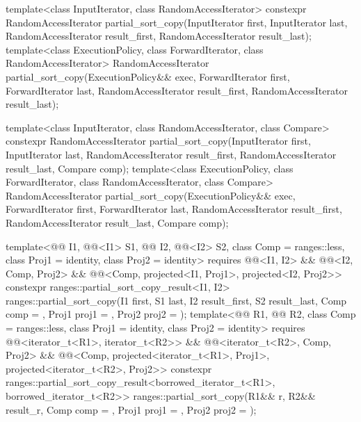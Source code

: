%
\begin{itemdecl}
template<class InputIterator, class RandomAccessIterator>
  constexpr RandomAccessIterator
    partial_sort_copy(InputIterator first, InputIterator last,
                      RandomAccessIterator result_first,
                      RandomAccessIterator result_last);
template<class ExecutionPolicy, class ForwardIterator, class RandomAccessIterator>
  RandomAccessIterator
    partial_sort_copy(ExecutionPolicy&& exec,
                      ForwardIterator first, ForwardIterator last,
                      RandomAccessIterator result_first,
                      RandomAccessIterator result_last);

template<class InputIterator, class RandomAccessIterator,
         class Compare>
  constexpr RandomAccessIterator
    partial_sort_copy(InputIterator first, InputIterator last,
                      RandomAccessIterator result_first,
                      RandomAccessIterator result_last,
                      Compare comp);
template<class ExecutionPolicy, class ForwardIterator, class RandomAccessIterator,
         class Compare>
  RandomAccessIterator
    partial_sort_copy(ExecutionPolicy&& exec,
                      ForwardIterator first, ForwardIterator last,
                      RandomAccessIterator result_first,
                      RandomAccessIterator result_last,
                      Compare comp);

template<@@ I1, @@<I1> S1, @@ I2, @@<I2> S2,
         class Comp = ranges::less, class Proj1 = identity, class Proj2 = identity>
  requires @@<I1, I2> && @@<I2, Comp, Proj2> &&
           @@<Comp, projected<I1, Proj1>, projected<I2, Proj2>>
  constexpr ranges::partial_sort_copy_result<I1, I2>
    ranges::partial_sort_copy(I1 first, S1 last, I2 result_first, S2 result_last,
                              Comp comp = {}, Proj1 proj1 = {}, Proj2 proj2 = {});
template<@@ R1, @@ R2, class Comp = ranges::less,
         class Proj1 = identity, class Proj2 = identity>
  requires @@<iterator_t<R1>, iterator_t<R2>> &&
           @@<iterator_t<R2>, Comp, Proj2> &&
           @@<Comp, projected<iterator_t<R1>, Proj1>,
                                      projected<iterator_t<R2>, Proj2>>
  constexpr ranges::partial_sort_copy_result<borrowed_iterator_t<R1>, borrowed_iterator_t<R2>>
    ranges::partial_sort_copy(R1&& r, R2&& result_r, Comp comp = {},
                              Proj1 proj1 = {}, Proj2 proj2 = {});
\end{itemdecl}

